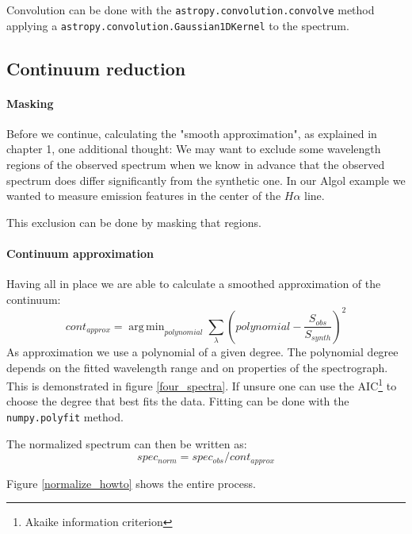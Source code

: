 \documentclass[10pt,a4paper,notitlepage,twocolumn]{article}
\DeclareMathOperator*{\argmin}{arg\,min}
\begin{document}
Convolution can be done with the \verb|astropy.convolution.convolve| method applying a \verb|astropy.convolution.Gaussian1DKernel| to the spectrum.

\subsection{Continuum reduction}

\paragraph{Masking}
Before we continue, calculating the "smooth approximation", as explained in chapter 1,
one additional thought:
We may want to exclude some wavelength regions of the observed spectrum when we know in advance that the observed spectrum does differ significantly from the synthetic one.
In our Algol example we wanted to measure emission features in the center of the $H\alpha$ line.

This exclusion can be done by masking that regions.

\paragraph{Continuum approximation}
Having all in place we are able to calculate a smoothed approximation of the continuum:
\begin{equation}
	cont_{approx} = \argmin_{polynomial} \sum_{\lambda} \left( polynomial - \frac{S_{obs}}{S_{synth}} \right)^2
\end{equation}
As approximation we use a polynomial of a given degree.
The polynomial degree depends on the fitted wavelength range and on properties of the spectrograph.
This is demonstrated in figure \ref{four_spectra}.
If unsure one can use the AIC\footnote{Akaike information criterion} \cite{Akaike1974} to choose the degree that best fits the data.
Fitting can be done with the \verb|numpy.polyfit| method.

The normalized spectrum can then be written as:
\begin{equation}
	spec_{norm} = spec_{obs} / cont_{approx}
\end{equation}

Figure \ref*{normalize_howto} shows the entire process.
\end{document}
